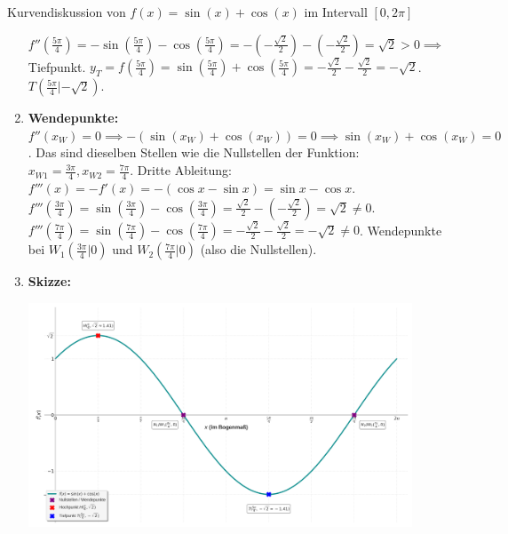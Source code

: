 \begin{beispielumgebung}{Kurvendiskussion von $f(x) = \sin(x) + \cos(x)$ im Intervall $[0, 2\pi]$}
\begin{enumerate}
        $f''(\frac{5\pi}{4}) = -\sin(\frac{5\pi}{4}) - \cos(\frac{5\pi}{4}) = -(-\frac{\sqrt{2}}{2}) - (-\frac{\sqrt{2}}{2}) = \sqrt{2} > 0 \implies$ Tiefpunkt.
        $y_T = f(\frac{5\pi}{4}) = \sin(\frac{5\pi}{4})+\cos(\frac{5\pi}{4}) = -\frac{\sqrt{2}}{2} - \frac{\sqrt{2}}{2} = -\sqrt{2}$. $T(\frac{5\pi}{4}|-\sqrt{2})$.
    \item \textbf{Wendepunkte:} $f''(x_W)=0 \implies -(\sin(x_W)+\cos(x_W))=0 \implies \sin(x_W)+\cos(x_W)=0$.
        Das sind dieselben Stellen wie die Nullstellen der Funktion: $x_{W1}=\frac{3\pi}{4}, x_{W2}=\frac{7\pi}{4}$.
        Dritte Ableitung: $f'''(x) = -f'(x) = -(\cos x - \sin x) = \sin x - \cos x$.
        $f'''(\frac{3\pi}{4}) = \sin(\frac{3\pi}{4}) - \cos(\frac{3\pi}{4}) = \frac{\sqrt{2}}{2} - (-\frac{\sqrt{2}}{2}) = \sqrt{2} \neq 0$.
        $f'''(\frac{7\pi}{4}) = \sin(\frac{7\pi}{4}) - \cos(\frac{7\pi}{4}) = -\frac{\sqrt{2}}{2} - \frac{\sqrt{2}}{2} = -\sqrt{2} \neq 0$.
        Wendepunkte bei $W_1(\frac{3\pi}{4}|0)$ und $W_2(\frac{7\pi}{4}|0)$ (also die Nullstellen).
    \item \textbf{Skizze:}
        \begin{center}
            \includegraphics[width=0.9\textwidth]{grafiken/Trig_Kurvendiskussion_SinPlusCos.png}
            \label{fig:kurvendisk_sinpluscos}
        \end{center}
\end{enumerate}
\end{beispielumgebung}

